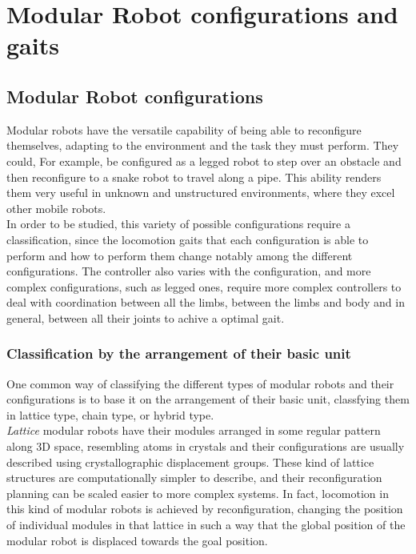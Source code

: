 \chapter{Modular Robot configurations and gaits}
\label{config_gait}

\section{Modular Robot configurations}
\label{config}

Modular robots have the versatile capability of being able to reconfigure themselves, adapting to the environment and the task they must perform. They could, For example, be configured as a legged robot to step over an obstacle and then reconfigure to a snake robot to travel along a pipe. This ability renders them very useful in unknown and unstructured environments, where they excel other mobile robots.\\

In order to be studied, this variety of possible configurations require a classification, since the locomotion gaits that each configuration is able to perform and how to perform them change notably among the different configurations. The controller also varies with the configuration, and more complex configurations, such as legged ones, require more complex controllers to deal with coordination between all the limbs, between the limbs and body and in general, between all their joints to achive a optimal gait.\\

\subsection{Classification by the arrangement of their basic unit}
\label{config_basic_unit}
One common way of classifying the different types of modular robots and their configurations is to base it on the arrangement of their basic unit, classfying them in lattice type, chain type, or hybrid type.\\

\emph{Lattice} modular robots have their modules arranged in some regular pattern along 3D space, resembling atoms in crystals and their configurations are usually described using crystallographic displacement groups. These kind of lattice structures are computationally simpler to describe, and their reconfiguration planning can be scaled easier to more complex systems. In fact, locomotion in this kind of modular robots is achieved by reconfiguration, changing the position of individual modules in that lattice in such a way that the global position of the modular robot is displaced towards the goal position. 
\\

